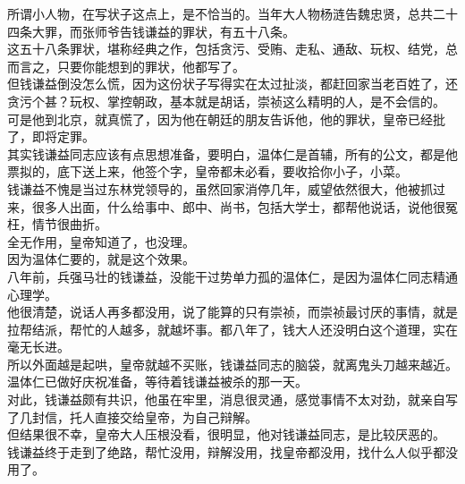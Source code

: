 \begin{multicols}{\theparacolNo}
所谓小人物，在写状子这点上，是不恰当的。当年大人物杨涟告魏忠贤，总共二十四条大罪，而张师爷告钱谦益的罪状，有五十八条。\\

这五十八条罪状，堪称经典之作，包括贪污、受贿、走私、通敌、玩权、结党，总而言之，只要你能想到的罪状，他都写了。\\

但钱谦益倒没怎么慌，因为这份状子写得实在太过扯淡，都赶回家当老百姓了，还贪污个甚？玩权、掌控朝政，基本就是胡话，崇祯这么精明的人，是不会信的。\\

可是他到北京，就真慌了，因为他在朝廷的朋友告诉他，他的罪状，皇帝已经批了，即将定罪。\\

其实钱谦益同志应该有点思想准备，要明白，温体仁是首辅，所有的公文，都是他票拟的，底下送上来，他签个字，皇帝都未必看，要收拾你小子，小菜。\\

钱谦益不愧是当过东林党领导的，虽然回家消停几年，威望依然很大，他被抓过来，很多人出面，什么给事中、郎中、尚书，包括大学士，都帮他说话，说他很冤枉，情节很曲折。\\

全无作用，皇帝知道了，也没理。\\

因为温体仁要的，就是这个效果。\\

八年前，兵强马壮的钱谦益，没能干过势单力孤的温体仁，是因为温体仁同志精通心理学。\\

他很清楚，说话人再多都没用，说了能算的只有崇祯，而崇祯最讨厌的事情，就是拉帮结派，帮忙的人越多，就越坏事。都八年了，钱大人还没明白这个道理，实在毫无长进。\\

所以外面越是起哄，皇帝就越不买账，钱谦益同志的脑袋，就离鬼头刀越来越近。\\

温体仁已做好庆祝准备，等待着钱谦益被杀的那一天。\\

对此，钱谦益颇有共识，他虽在牢里，消息很灵通，感觉事情不太对劲，就亲自写了几封信，托人直接交给皇帝，为自己辩解。\\

但结果很不幸，皇帝大人压根没看，很明显，他对钱谦益同志，是比较厌恶的。\\

钱谦益终于走到了绝路，帮忙没用，辩解没用，找皇帝都没用，找什么人似乎都没用了。\\


\end{multicols}
